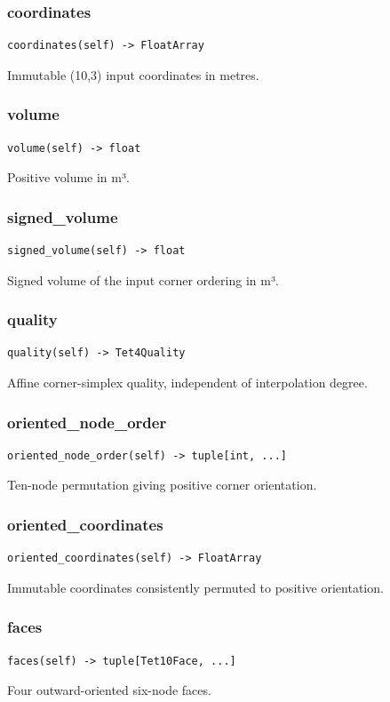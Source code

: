 \subsubsection*{coordinates}
\begin{lstlisting}
coordinates(self) -> FloatArray
\end{lstlisting}
Immutable (10,3) input coordinates in metres.
\subsubsection*{volume}
\begin{lstlisting}
volume(self) -> float
\end{lstlisting}
Positive volume in m³.
\subsubsection*{signed\_volume}
\begin{lstlisting}
signed_volume(self) -> float
\end{lstlisting}
Signed volume of the input corner ordering in m³.
\subsubsection*{quality}
\begin{lstlisting}
quality(self) -> Tet4Quality
\end{lstlisting}
Affine corner-simplex quality, independent of interpolation degree.
\subsubsection*{oriented\_node\_order}
\begin{lstlisting}
oriented_node_order(self) -> tuple[int, ...]
\end{lstlisting}
Ten-node permutation giving positive corner orientation.
\subsubsection*{oriented\_coordinates}
\begin{lstlisting}
oriented_coordinates(self) -> FloatArray
\end{lstlisting}
Immutable coordinates consistently permuted to positive orientation.
\subsubsection*{faces}
\begin{lstlisting}
faces(self) -> tuple[Tet10Face, ...]
\end{lstlisting}
Four outward-oriented six-node faces.
